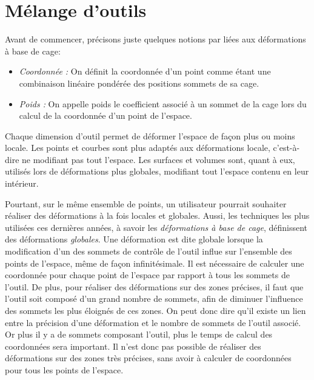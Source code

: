 
\chapter{Mélange d'outils}

\graphicspath{ {Chapter2/Chapter2Figs/PNG/}
  {Chapter2/Chapter2Figs/PDF/} {Chapter2/Chapter2Figs/} }

Avant de commencer, précisons juste quelques notions par liées aux
déformations à base de cage:
\begin{itemize}
\item{\textit{Coordonnée :}} On définit la coordonnée d'un point comme
  étant une combinaison linéaire pondérée des positions sommets de sa
  cage.
\item{\textit{Poids :}} On appelle poids le coefficient associé à un
  sommet de la cage lors du calcul de la coordonnée d'un point de
  l'espace.\\
\end{itemize}

Chaque dimension d'outil permet de déformer l'espace de façon plus ou
moins locale. Les points et courbes sont plus adaptés aux déformations
locale, c'est-à-dire ne modifiant pas tout l'espace. Les surfaces et
volumes sont, quant à eux, utilisés lors de déformations plus
globales, modifiant tout l'espace contenu en leur intérieur.

Pourtant, sur le même ensemble de points, un utilisateur pourrait
souhaiter réaliser des déformations à la fois locales et
globales. Aussi, les techniques les plus utilisées ces dernières
années, à savoir les \textit{déformations à base de cage}, définissent
des déformations \textit{globales}. Une déformation est dite globale
lorsque la modification d'un des sommets de contrôle de l'outil influe
sur l'ensemble des points de l'espace, même de façon
infinitésimale. Il est nécessaire de calculer une coordonnée pour
chaque point de l'espace par rapport à tous les sommets de l'outil. De
plus, pour réaliser des déformations sur des zones précises, il faut
que l'outil soit composé d'un grand nombre de sommets, afin de
diminuer l'influence des sommets les plus éloignés de ces zones. On
peut donc dire qu'il existe un lien entre la précision d'une
déformation et le nombre de sommets de l'outil associé. Or plus il y a
de sommets composant l'outil, plus le temps de calcul des coordonnées
sera important. Il n'est donc pas possible de réaliser des
déformations sur des zones très précises, sans avoir à calculer de
coordonnées pour tous les points de l'espace.

